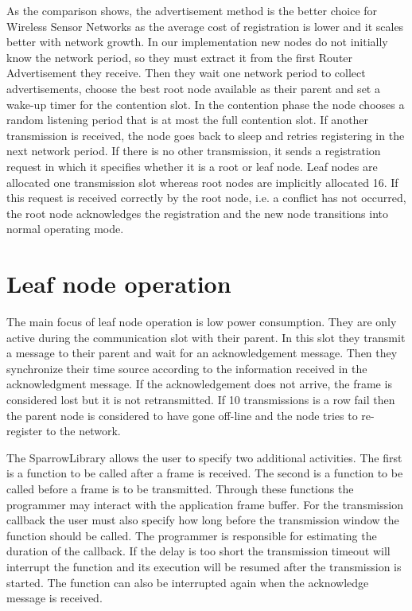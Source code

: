 As the comparison shows, the advertisement method is the better choice for
Wireless Sensor Networks as the average cost of registration is lower and it
scales better with network growth. In our implementation new nodes do not
initially know the network period, so they must extract it from the first
Router Advertisement they receive. Then they wait one network period to collect
advertisements, choose the best root node available as their parent and set a
wake-up timer for the contention slot. In the contention phase the node chooses
a random listening period that is at most the full contention slot. If another
transmission is received, the node goes back to sleep and retries registering
in the next network period. If there is no other transmission, it sends a registration
request in which it specifies whether it is a root or leaf node.  Leaf nodes
are allocated one transmission slot whereas root nodes are implicitly allocated
16. If this request is received correctly by the root node, i.e. a conflict has
not occurred, the root node acknowledges the registration and the new node
transitions into normal operating mode.

\section{Leaf node operation}
\label{sec:leaf_node_operation}

The main focus of leaf node operation is low power consumption. They are only
active during the communication slot with their parent. In this slot they
transmit a message to their parent and wait for an acknowledgement message.
Then they synchronize their time source according to the information received
in the acknowledgment message. If the acknowledgement does not arrive, the frame
is considered lost but it is not retransmitted. If 10 transmissions is a row
fail then the parent node is considered to have gone off-line and the node
tries to re-register to the network. 

The SparrowLibrary allows the user to specify two additional activities. The
first is a function to be called after a frame is received. The second is a
function to be called before a frame is to be transmitted. Through these
functions the programmer may interact with the application frame buffer. For
the transmission callback the user must also specify how long before the
transmission window the function should be called.  The programmer is
responsible for estimating the duration of the callback. If the delay  is too
short the transmission timeout will interrupt the function and its execution
will be resumed after the transmission is started. The function can also be interrupted again
when the acknowledge message is received.


